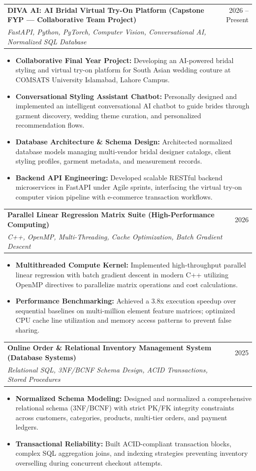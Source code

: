 \documentclass[letterpaper,10pt]{article}
\makeatletter
\newcommand{\resumeItem}[1]{
  \item\small{
    {#1 \vspace{-1.5pt}}
  }
}
\newcommand{\resumeProjectHeading}[3]{
  \vspace{2.5pt}\item
    \begin{tabular*}{0.98\textwidth}[t]{l@{\extracolsep{\fill}}r}
      \textbf{#1} & \small #2 \\
      \textit{\small #3} & \\
    \end{tabular*}\vspace{-4pt}
}
\newcommand{\resumeItemListStart}{\begin{itemize}[leftmargin=0.15in]}
\newcommand{\resumeItemListEnd}{\end{itemize}\vspace{-3pt}}
\makeatother
\begin{document}
    \resumeProjectHeading
        {DIVA AI: AI Bridal Virtual Try-On Platform \normalfont(Capstone FYP --- Collaborative Team Project)}{2026 -- Present}
        {FastAPI, Python, PyTorch, Computer Vision, Conversational AI, Normalized SQL Database}
        \resumeItemListStart
          \resumeItem{\textbf{Collaborative Final Year Project:} Developing an AI-powered bridal styling and virtual try-on platform for South Asian wedding couture at COMSATS University Islamabad, Lahore Campus.}
          \resumeItem{\textbf{Conversational Styling Assistant Chatbot:} Personally designed and implemented an intelligent conversational AI chatbot to guide brides through garment discovery, wedding theme curation, and personalized recommendation flows.}
          \resumeItem{\textbf{Database Architecture \& Schema Design:} Architected normalized database models managing multi-vendor bridal designer catalogs, client styling profiles, garment metadata, and measurement records.}
          \resumeItem{\textbf{Backend API Engineering:} Developed scalable RESTful backend microservices in FastAPI under Agile sprints, interfacing the virtual try-on computer vision pipeline with e-commerce transaction workflows.}
        \resumeItemListEnd

    \resumeProjectHeading
        {Parallel Linear Regression Matrix Suite \normalfont(High-Performance Computing)}{2026}
        {C++, OpenMP, Multi-Threading, Cache Optimization, Batch Gradient Descent}
        \resumeItemListStart
          \resumeItem{\textbf{Multithreaded Compute Kernel:} Implemented high-throughput parallel linear regression with batch gradient descent in modern C++ utilizing OpenMP directives to parallelize matrix operations and cost calculations.}
          \resumeItem{\textbf{Performance Benchmarking:} Achieved a 3.8x execution speedup over sequential baselines on multi-million element feature matrices; optimized CPU cache line utilization and memory access patterns to prevent false sharing.}
        \resumeItemListEnd

    \resumeProjectHeading
        {Online Order \& Relational Inventory Management System \normalfont(Database Systems)}{2025}
        {Relational SQL, 3NF/BCNF Schema Design, ACID Transactions, Stored Procedures}
        \resumeItemListStart
          \resumeItem{\textbf{Normalized Schema Modeling:} Designed and normalized a comprehensive relational schema (3NF/BCNF) with strict PK/FK integrity constraints across customers, categories, products, multi-tier orders, and payment ledgers.}
          \resumeItem{\textbf{Transactional Reliability:} Built ACID-compliant transaction blocks, complex SQL aggregation joins, and indexing strategies preventing inventory overselling during concurrent checkout attempts.}
        \resumeItemListEnd
\end{document}

